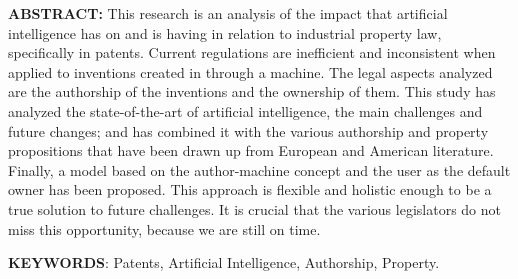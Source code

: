 \documentclass[12pt]{article}
\begin{document}
\vspace{\baselineskip}
\par


\vspace{\baselineskip}

\vspace{\baselineskip}

\vspace{\baselineskip}

\vspace{\baselineskip}
\begin{justify}
\textbf{ABSTRACT:} This research is an analysis of the impact that artificial intelligence has on and is having in relation to industrial property law, specifically in patents. Current regulations are inefficient and inconsistent when applied to inventions created in through a machine. The legal aspects analyzed are the authorship of the inventions and the ownership of them. This study has analyzed the state-of-the-art of artificial intelligence, the main challenges and future changes; and has combined it with the various authorship and property propositions that have been drawn up from European and American literature. Finally, a model based on the author-machine concept and the user as the default owner has been proposed. This approach is flexible and holistic enough to be a true solution to future challenges. It is crucial that the various legislators do not miss this opportunity, because we are still on time.
\end{justify}\par


\vspace{\baselineskip}

\vspace{\baselineskip}
\begin{justify}
{\fontsize{10pt}{12.0pt}\selectfont \textbf{KEYWORDS}: Patents, Artificial Intelligence, Authorship, Property. \par}
\end{justify}\par


\vspace{\baselineskip}
\end{document}
